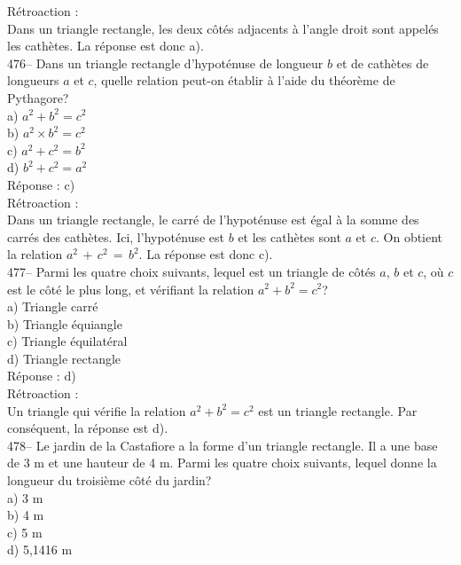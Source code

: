 ﻿\documentclass[letterpaper, 12pt]{article}
\begin{document}
R\'etroaction : \\
Dans un triangle rectangle, les deux c\^ot\'es adjacents \`a l'angle droit
sont appel\'es les cath\`etes.  La r\'eponse est donc a).\\

476-- Dans un triangle rectangle d'hypot\'enuse de longueur $b$ et de
cath\`etes de longueurs $a$ et $c$, quelle relation peut-on \'etablir \`a
l'aide du th\'eor\`eme de Pythagore?\\
a) $a^{2}+b^{2}=c^{2}$\\
b) $a^{2}\times b^{2}=c^{2}$\\
c) $a^{2}+c^{2}=b^{2}$\\
d) $b^{2}+c^{2}=a^{2}$\\

R\'eponse :  c)\\

R\'etroaction : \\
Dans un triangle rectangle, le carr\'e de l'hypot\'enuse est \'egal \`a la
somme des carr\'es des cath\`etes.  Ici, l'hypot\'enuse est $b$ et les
cath\`etes sont $a$ et $c$.  On obtient la relation
$a^{2}\,+\,c^{2}\,=\,b^{2}$.  La r\'eponse est donc c).\\


477-- Parmi les quatre choix suivants, lequel est un triangle de c\^ot\'es
$a$, $b$ et $c$, o\`u $c$ est le c\^ot\'e le plus long, et v\'erifiant la
relation  $a^{2}+b^{2}=c^{2}$?\\
a) Triangle carr\'e\\
b) Triangle \'equiangle\\
c) Triangle \'equilat\'eral\\
d) Triangle rectangle\\

R\'eponse :  d)\\

R\'etroaction : \\
Un triangle qui v\'erifie la relation $a^{2}+b^{2}=c^{2}$ est un triangle
rectangle. Par cons\'equent, la r\'eponse est d).\\


478-- Le jardin de la Castafiore a la forme d'un triangle rectangle.  Il a
une base de
3 m et une hauteur de 4 m.  Parmi les quatre choix suivants, lequel donne la
longueur du troisi\`eme c\^ot\'e du jardin?\\
a) 3 m\\
b) 4 m\\
c) 5 m\\
d) 5,1416 m\\
\end{document}
